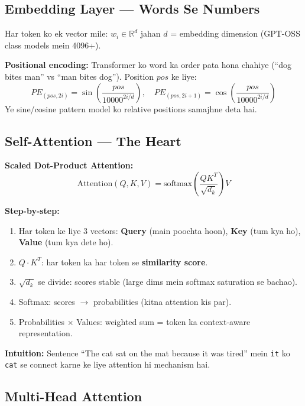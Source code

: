 \subsection{Embedding Layer --- Words Se Numbers}

\begin{mathbox}
Har token ko ek vector mile: $w_i \in \mathbb{R}^{d}$ jahan $d$ = embedding dimension (GPT-OSS class models mein 4096+).

\textbf{Positional encoding:} Transformer ko word ka order pata hona chahiye (``dog bites man'' vs ``man bites dog''). Position $pos$ ke liye:
\[
PE_{(pos, 2i)} = \sin\left(\frac{pos}{10000^{2i/d}}\right), \quad
PE_{(pos, 2i+1)} = \cos\left(\frac{pos}{10000^{2i/d}}\right)
\]
Ye sine/cosine pattern model ko relative positions samajhne deta hai.
\end{mathbox}

\subsection{Self-Attention --- The Heart}

\begin{mathbox}
\textbf{Scaled Dot-Product Attention:}
\[
\text{Attention}(Q, K, V) = \text{softmax}\left(\frac{QK^T}{\sqrt{d_k}}\right)V
\]

\textbf{Step-by-step:}
\begin{enumerate}[label=\arabic*.]
\item Har token ke liye 3 vectors: \textbf{Query} (main poochta hoon), \textbf{Key} (tum kya ho), \textbf{Value} (tum kya dete ho).
\item $Q \cdot K^T$: har token ka har token se \textbf{similarity score}.
\item $\sqrt{d_k}$ se divide: scores stable (large dims mein softmax saturation se bachao).
\item Softmax: scores $\rightarrow$ probabilities (kitna attention kis par).
\item Probabilities $\times$ Values: weighted sum = token ka context-aware representation.
\end{enumerate}

\textbf{Intuition:} Sentence ``The cat sat on the mat because it was tired'' mein \texttt{it} ko \texttt{cat} se connect karne ke liye attention hi mechanism hai.
\end{mathbox}

\subsection{Multi-Head Attention}

